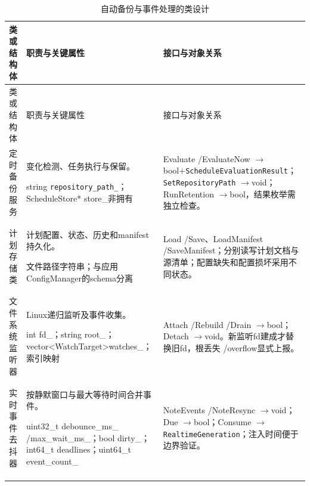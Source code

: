 \begin{longtable}{@{}L{.22\linewidth}L{.34\linewidth}L{.38\linewidth}@{}}
\caption{自动备份与事件处理的类设计}\label{tab:classes-2}\\
\toprule 类或结构体 & 职责与关键属性 & 接口与对象关系\\\midrule\endfirsthead
\toprule 类或结构体 & 职责与关键属性 & 接口与对象关系\\\midrule\endhead
\bottomrule\endfoot

定时备份服务\par{} & 变化检测、任务执行与保留。\par string \nolinkurl{repository\_path\_}；ScheduleStore* store\_非拥有 & Evaluate /\allowbreak EvaluateNow $\to$\allowbreak bool+\allowbreak \nolinkurl{ScheduleEvaluationResult}；\nolinkurl{SetRepositoryPath} $\to$\allowbreak void；RunRetention $\to$\allowbreak bool，结果枚举需独立检查。\\\addlinespace[4pt]

计划存储类\par{} & 计划配置、状态、历史和manifest持久化。\par 文件路径字符串；与应用ConfigManager的schema分离 & Load /\allowbreak Save、LoadManifest /\allowbreak SaveManifest；分别读写计划文档与源清单；配置缺失和配置损坏采用不同状态。\\\addlinespace[4pt]

文件系统监听器\par{} & Linux递归监听及事件收集。\par int fd\_；string root\_；vector<\allowbreak WatchTarget>\allowbreak  watches\_；索引映射 & Attach /\allowbreak Rebuild /\allowbreak Drain $\to$\allowbreak bool；Detach $\to$\allowbreak void。新监听fd建成才替换旧fd，根丢失 /\allowbreak overflow显式上报。\\\addlinespace[4pt]

实时事件去抖器\par{} & 按静默窗口与最大等待时间合并事件。\par uint32\_t debounce\_ms\_ /\allowbreak max\_wait\_ms\_；bool dirty\_；int64\_t deadlines；uint64\_t event\_count\_ & NoteEvents /\allowbreak NoteResync $\to$\allowbreak void；Due $\to$\allowbreak bool；Consume $\to$\allowbreak \nolinkurl{RealtimeGeneration}；注入时间便于边界验证。\\\addlinespace[4pt]

\end{longtable}


